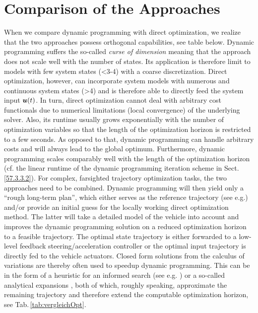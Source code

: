 \section{Comparison of the Approaches}\label{S:57.4}


When we compare dynamic programming with direct optimization, we realize that the two approaches possess orthogonal capabilities, see table below.
 Dynamic programming suffers the so-called \emph{curse of dimension} \cite{bellman_DP} 
meaning that the approach does not scale well with the number of states. Its application is therefore limit to models with few system states (<3-4) with a coarse discretization. Direct optimization, however, can incorporate system models with numerous and continuous system states (>4) and is therefore able to directly feed the system input $\boldsymbol{u}(t)$. In turn, direct optimization cannot deal with arbitrary cost functionals due to numerical limitations (local convergence) of the underlying solver. Also, its runtime usually grows exponentially with the number of optimization variables so that the length of the optimization horizon is restricted to a few seconds. As opposed to that, dynamic programming can handle arbitrary costs and will always lead to the global optimum. Furthermore, dynamic programming scales comparably well with the length of the optimization horizon (cf. the linear runtime of the dynamic programming iteration scheme in  Sect. \ref{57.3.3.2}). 
For complex, farsighted trajectory optimization tasks, the two approaches need to be combined. Dynamic programming will then yield only a “rough long-term plan”, which either serves as the reference trajectory (see e.g.\cite{Ferguson2008, Ferguson2008b, gu2013focused}) and/or provide an initial guess \cite{kang2012online} %
for the locally working direct optimization method. The latter will take a detailed model of the vehicle into account and improves the dynamic programming solution on a reduced optimization horizon to a feasible trajectory. The optimal state trajectory is either forwarded to a low-level feedback steering/acceleration controller or the optimal input trajectory is directly fed to the vehicle actuators.
Closed form solutions from the calculus of variations are thereby often used to speedup dynamic programming. This can be in the form of a heuristic for an informed search (see e.g. \cite{zieglerIV08}) %
or a so-called analytical expansions \cite{dolgov2010path}, %
both of which, roughly speaking, approximate the remaining trajectory and therefore extend the computable optimization horizon, see  Tab.\,\ref{tab:vergleichOpt}.

